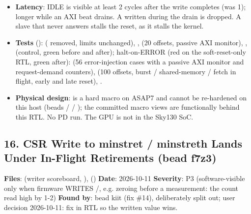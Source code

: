 \begin{record}
\begin{itemize}
  \texttt{BLOCK\_\allowbreak{}X\ =\allowbreak{}\ 0} hang
  ( = 0 never issues, never done) was unrecoverable
  except by hardware reset (RUNNING ignored ); it is
  now recoverable by . The hang itself is untouched.
  Warp-count and tail-lane behaviour unchanged.
\item
  \textbf{Latency}: IDLE is visible at least 2 cycles after the
   write completes (was 1); longer while an AXI beat drains.
  A  written during the drain is dropped. A slave that
  never answers stalls the reset, as it stalls the kernel.
\item
  \textbf{Tests} ():
   (
  removed, limits unchanged),
  ,
   (20 offsets,
  passive AXI monitor), ,
   (control, green
  before and after); halt-on-ERROR (red on the soft-reset-only RTL,
  green after):  (56
  error-injection cases with a passive AXI monitor and request-demand
  counters), 
  (100 offsets, burst / shared-memory / fetch in flight, early and late
  reset), .
\item
  \textbf{Physical design}:  is a hard macro on ASAP7 and
  cannot be re-hardened on this host (beads  /  /
  ); the committed macro views are functionally behind this
  RTL. No PD run. The GPU is not in the Sky130 SoC.
\end{itemize}

\end{record}

\subsection{16. CSR Write to minstret / minstreth Lands Under In-Flight
Retirements (bead f7z3)}\label{cr:fix:fixes-index:16-csr-write-to-minstret-minstreth-lands-under-in-flight-retirements-bead-f7z3}

\begin{record}

\textbf{Files}:  (writer scoreboard,
), 
() \textbf{Date}: 2026-10-11 \textbf{Severity}:
P3 (software-visible only when firmware WRITES
/, e.g. zeroing before a measurement: the
count read high by 1-2) \textbf{Found by}: bead kiit (fix \#14),
deliberately split out; user decision 2026-10-11: fix in RTL so the
written value wins.

\end{record}

